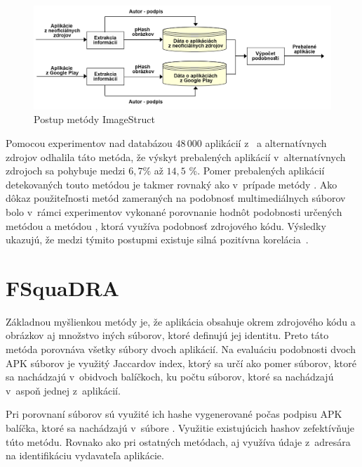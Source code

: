 \begin{figure}[htb]
  \begin{center}
    \includegraphics[width=130mm]{images/ImageStruct.png}
  \end{center}
  \caption{Postup metódy ImageStruct}
  \label{fig:strukturaImageStruct}
\end{figure}

Pomocou experimentov nad databázou $48\,000$ aplikácií z~ a alternatívnych zdrojov odhalila táto metóda, že výskyt prebalených aplikácií v~alternatívnych zdrojoch sa pohybuje medzi $6,7 \%$ až $14,5$ \%.
Pomer prebalených aplikácií detekovaných touto metódou je takmer rovnaký ako v~prípade metódy . Ako dôkaz použiteľnosti metód zameraných na podobnosť multimediálnych súborov bolo v~rámci experimentov vykonané porovnanie hodnôt podobnosti určených metódou  a metódou , ktorá využíva podobnosť zdrojového kódu. Výsledky ukazujú, že medzi týmito postupmi existuje silná pozitívna korelácia~\cite{ImageStruct}. 


\section{FSquaDRA}
Základnou myšlienkou metódy  je, že aplikácia obsahuje okrem zdrojového kódu a obrázkov aj množstvo iných súborov, ktoré definujú jej identitu. Preto táto metóda porovnáva všetky súbory dvoch aplikácií. Na evaluáciu podobnosti dvoch APK súborov je využitý Jaccardov index, ktorý sa určí ako pomer súborov, ktoré sa nachádzajú v~obidvoch balíčkoch, ku počtu súborov, ktoré sa nachádzajú v~aspoň jednej z~aplikácií.

Pri porovnaní súborov sú využité ich hashe vygenerované počas podpisu APK balíčka, ktoré sa nachádzajú v~súbore . Využitie existujúcich hashov zefektívňuje túto metódu.
Rovnako ako pri ostatných metódach, aj  využíva údaje z~adresára  na identifikáciu vydavateľa aplikácie. 

